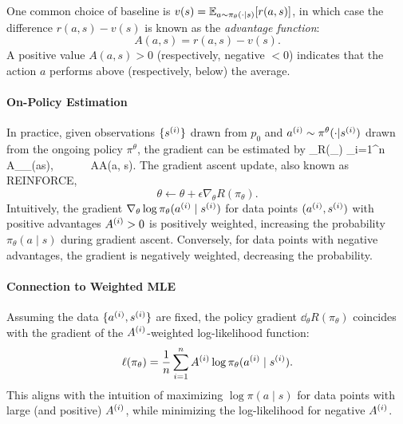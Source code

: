 \documentclass[11pt,letterpaper]{article}
\begin{document}
One common choice of baseline is $v(s) = \mathbb{E}_{a\sim \pi_\theta(\cdot|s)}[r(a,s)]$, in which case the difference $r(a,s) - v(s)$ is known as the \emph{advantage function}:
$$
A(a, s) = r(a,s) - v(s).
$$
A positive value $A(a,s) > 0$ (respectively, negative $<0$) indicates that the action $a$ performs above (respectively, below) the average. 



\paragraph{On-Policy Estimation} 
In practice, given observations $\{s^{(i)}\}$ drawn from $p_0$ and $a^{(i)} \sim \pi^\theta(\cdot|s^{(i)})$ drawn from the ongoing policy $\pi^\theta$, 
the gradient can be estimated by 
\bbb \label{equ:onpolicyestimate}
\nabla_\theta  R(\pi_\theta ) 
 \approx {}\sum_{i=1}^n  
A\datai \nabla_\theta  \log  \pi_\theta (a\datai \mid s\datai),~~~~~~ 
 A\datai {}  A(a\datai, s\datai). 
\eee  
The gradient ascent update, also known as REINFORCE, 
$$
\theta\gets \theta + \epsilon \nabla_\theta  R(\pi_\theta ).  
$$
Intuitively, the gradient $\nabla_\theta \log \pi_\theta (a^{(i)} \mid s^{(i)})$ for data points $(a^{(i)}, s^{(i)})$ with positive advantages $A^{(i)} > 0$ is positively weighted, increasing the probability $\pi_\theta(a \mid s)$ during gradient ascent. Conversely, for data points with negative advantages, the gradient is negatively weighted, decreasing the probability.  


\paragraph{Connection to Weighted MLE}  
Assuming the data $\{a^{(i)}, s^{(i)}\}$ are fixed, the policy gradient $\dd_\theta R(\pi_\theta)$ coincides with the gradient of the $A^{(i)}$-weighted log-likelihood function:  
$$
\ell(\pi_\theta) = \frac{1}{n} \sum_{i=1}^n A^{(i)} \log \pi_\theta(a^{(i)} \mid s^{(i)}).
$$  
This aligns with the intuition of maximizing $\log \pi(a \mid s)$ for data points with large (and positive) $A^{(i)}$, while minimizing the log-likelihood for negative $A^{(i)}$.  
\end{document}
